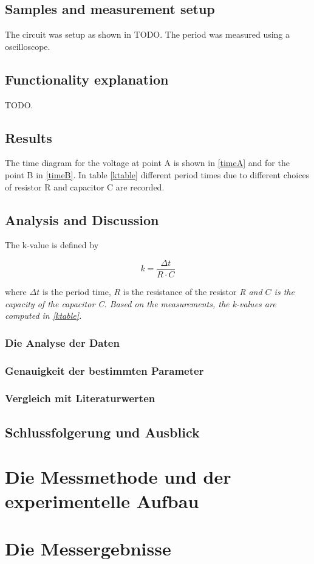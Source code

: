 \documentclass[journal]{IEEEtran}
\begin{document}
\subsection{Samples and measurement setup}


The circuit was setup as shown in TODO. The period was measured using a
oscilloscope.

\subsection{Functionality explanation}

TODO.

\subsection{Results}

The time diagram for the voltage at point A is shown in \ref{timeA} and for the
point B in \ref{timeB}. In table \ref{ktable} different period times due to
different choices of resistor R and capacitor C are recorded.  

\subsection{Analysis and Discussion}

The k-value is defined by

\begin{equation}
	k = \frac{\Delta t}{R \cdot C}
\end{equation}

where $\Delta t$ is the period time, $R$ is the resistance of the resistor
\em{R} and $C$ is the capacity of the capacitor \em{C}. Based on the
measurements, the k-values are computed in \ref{ktable}.

\subsubsection{Die Analyse der Daten}

\subsubsection{Genauigkeit der bestimmten Parameter}

\subsubsection{Vergleich mit Literaturwerten}

\subsection{Schlussfolgerung und Ausblick }

\section{Die Messmethode und der experimentelle Aufbau}

\section{Die Messergebnisse}
\end{document}

